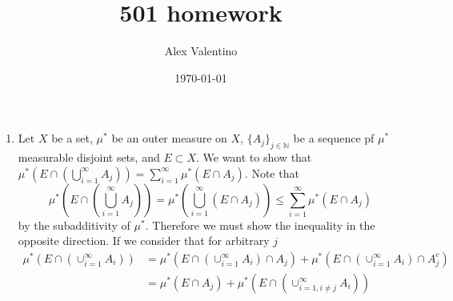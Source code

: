 \documentclass[12pt, letterpaper]{article}
\date{\today}
\author{Alex Valentino}
\title{501 homework}
\newcommand{\N}{\mathbb{N}}
\begin{document}
\begin{enumerate}
	\item[1] Let $X$ be a set, $\mu^*$ be an outer measure on $X$,
	$\{A_j\}_{j \in \N}$ be a sequence pf $\mu^*$ measurable disjoint sets, and 
	$E \subset X$.  We want to show that
	$\mu^*(E \cap ( \bigcup_{i=1}^\infty A_j)) = \sum_{i=1}^\infty \mu^*(E \cap A_j) $.  Note that $$\mu^*(E \cap ( \bigcup_{i=1}^\infty A_j)) = 
	\mu^*(\bigcup_{i=1}^\infty (E \cap A_j)) \leq \sum_{i=1}^\infty \mu^*(E \cap A_j)
	$$ by the subadditivity of $\mu^*$.  Therefore we must show the inequality in 
	the opposite direction. If we consider that for arbitrary $j$
	\begin{align*}
	\mu^*(E \cap (\cup_{i=1}^\infty A_i)) &= \mu^*(E \cap (\cup_{i=1}^\infty A_i) \cap A_j) + \mu^*(E \cap (\cup_{i=1}^\infty A_i) \cap A_j^c)\\
	&= \mu^*(E \cap A_j) + \mu^*(E \cap (\cup_{i=1, i \neq j}^\infty A_i))
	\end{align*}


\end{enumerate}
\end{document}
